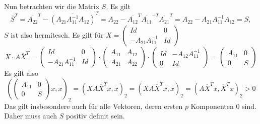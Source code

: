 \documentclass{article}
\theoremstyle{definition}
\begin{document}
\begin{enumerate}[(a)]
          Nun betrachten wir die Matrix $S$. Es gilt
          \[
              \overline{S}^T = \overline{A_{22}}^T - \overline{(A_{21}A_{11}^{-1}A_{12})}^T = A_{22} - \overline{A_{12}}^T \overline{A_{11}}^{-T} \overline{A_{21}}^T = A_{22} - A_{21} A_{11}^{-1}A_{12} = S,
          \] $S$ ist also hermitesch.
          Es gilt für $X = \begin{pmatrix}
                  Id & 0 \\-A_{21}A_{11}^{-1}& Id
              \end{pmatrix}$
          \[
              X
              \cdot A \overline{X}^T = \begin{pmatrix}
                  Id & 0 \\-A_{21}A_{11}^{-1}& Id
              \end{pmatrix}
              \cdot \begin{pmatrix}
                  A_{11} & A_{12} \\ A_{21} & A_{22}
              \end{pmatrix} \cdot
              \begin{pmatrix}
                  Id & -A_{12}A_{11}^{-1} \\0&Id
              \end{pmatrix}=
              \begin{pmatrix}
                  A_{11} & 0 \\0&S
              \end{pmatrix}
          \]
          Es gilt also
          \[
              \left(\begin{pmatrix}
                      A_{11} & 0 \\0&S
                  \end{pmatrix}x, x\right)_2 = \left(XA\overline{X}^Tx,x\right)_2 =\left(XA\overline{X}^Tx,x\right)_2 = \left(A\overline{X}^Tx, \overline{X}^Tx\right)_2 > 0
          \]
          Das gilt insbesondere auch für alle Vektoren, deren ersten $p$ Komponenten 0 sind. Daher muss auch $S$ positiv definit sein.
\end{enumerate}
\end{document}
